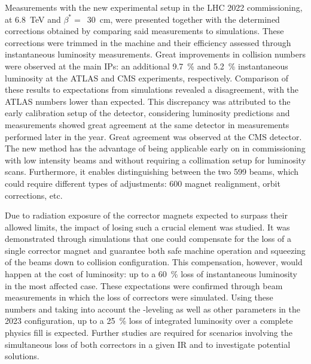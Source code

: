 Measurements with the new experimental setup in the \gls{LHC} \num{2022} commissioning, at \qty{6.8}{\tera\electronvolt} and \(\beta^{\ast} =\)~\qty{30}{\centi\meter}, were presented together with the determined corrections obtained by comparing said measurements to simulations.
These corrections were trimmed in the machine and their efficiency assessed through instantaneous \gls{luminosity} measurements.
Great improvements in collision numbers were observed at the main \glspl{IP}: an additional \qty{9.7}{\percent} and \qty{5.2}{\percent} instantaneous luminosity at the \acrshort{ATLAS} and \acrshort{CMS} \glspl{experiment}, respectively.
Comparison of these results to expectations from simulations revealed a disagreement, with the \acrshort{ATLAS} numbers lower than expected.
This discrepancy was attributed to the early calibration setup of the detector, considering luminosity predictions and measurements showed great agreement at the same detector in measurements performed later in the year.
Great agreement was observed at the \acrshort{CMS} detector.
The new method has the advantage of being applicable early on in commissioning with low intensity beams and without requiring a collimation setup for luminosity scans.
Furthermore, it enables distinguishing between the two 599 beams, which could require different types of adjustments: 600 magnet realignment, orbit corrections, etc.

Due to radiation exposure of the corrector magnets expected to surpass their allowed limits, the impact of losing such a crucial element was studied.
It was demonstrated through simulations that one could compensate for the loss of a single corrector magnet and guarantee both safe machine operation and squeezing of the beams down to collision configuration.
This compensation, however, would happen at the cost of luminosity: up to a \qty{60}{\percent} loss of instantaneous luminosity in the most affected case.
These expectations were confirmed through beam measurements in which the loss of correctors were simulated.
Using these numbers and taking into account the -leveling as well as other parameters in the \num{2023} configuration, up to a \qty{25}{\percent} loss of integrated luminosity over a complete physics fill is expected.
Further studies are required for scenarios involving the simultaneous loss of both correctors in a given \gls{IR} and to investigate potential solutions.
\break 


